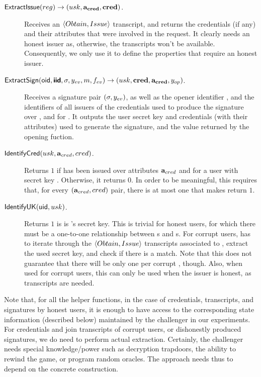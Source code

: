 \begin{description}
\item[$\mathsf{ExtractIssue}(reg) \rightarrow (usk,\mathbf{a}_{\mathbf{cred}},\mathbf{cred})$.]
  Receives an $\langle Obtain, Issue \rangle$ transcript, and returns the
  credentials (if any) and their attributes that were involved
  in the request. It clearly needs an honest issuer as, otherwise, the
  transcripts won't be available. Consequently, we only use it to define the
  properties that require an honest issuer.
\item[$\mathsf{ExtractSign}(\mathsf{oid},\boldsymbol{\mathsf{\mathsf{iid}}},\sigma,y_{ev},m,f_{ev}) \rightarrow (usk,
  \mathbf{cred},\mathbf{a}_{\mathbf{cred}},y_{op})$.] Receives a signature pair $(\sigma,y_{ev})$,
  as well as the opener identifier \oid, and the identifiers of all issuers of
  the credentials used to produce the signature over \msg, and for \feval. It
  outputs the user secret key and credentials (with their attributes) used to
  generate the signature, and the value returned by the opening fuction.
\item[$\mathsf{IdentifyCred}(usk,\mathbf{a}_{cred},cred)$.] Returns $1$ if \cred has been
  issued over attributes $\mathbf{a}_{cred}$ and for a user with secret key \usk.
  Otherwise, it returns $0$. In order to be meaningful, this requires that,
  for every $(\mathbf{a}_{cred},cred)$ pair, there is at most one \usk that makes
  \IdentifyCred return $1$.
\item[$\mathsf{IdentifyUK}(\mathsf{uid},usk)$.] Returns $1$ is \usk is {\uid}'s secret key.
  This is trivial for honest users, for which there must be a one-to-one
  relationship between {\uid}s and {\usk}s. For corrupt users, \IdentifyUK has
  to iterate through the $\langle Obtain,Issue\rangle$ transcripts associated
  to \uid, extract the used secret key, and check if there is a match. Note that
  this does not guarantee that there will be only one \usk per corrupt \uid,
  though. Also, when used for corrupt users, this can only be used when the
  issuer is honest, as transcripts are needed. 
\end{description}

Note that, for all the helper functions, in the case of credentials, transcripts,
and signatures by honest users, it is enough to have access to the corresponding
state information (described below) maintained by the challenger in our
experiments. For credentials and join transcripts of corrupt users, or
dishonestly produced signatures, we do need to perform actual extraction.
Certainly, the challenger
needs special knowledge/power such as decryption trapdoors, the ability to
rewind the game, or program random oracles. The approach needs thus to depend on
the concrete construction. 

